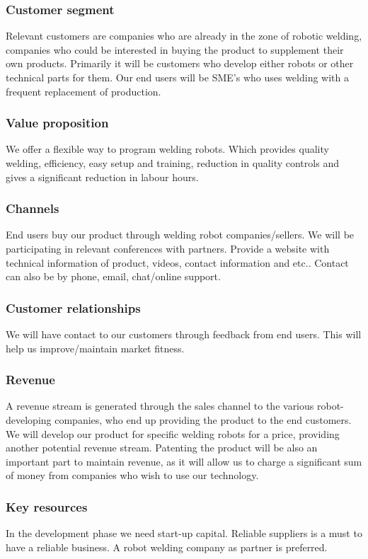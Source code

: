 \subsubsection{Customer segment}
Relevant customers are companies who are already in the zone of robotic welding, companies who could be interested in buying the product to supplement their own products. Primarily it will be customers who develop either robots or other technical parts for them.  
Our end users will be SME's who uses welding with a frequent replacement of production.
\subsubsection{Value proposition}
We offer a flexible way to program welding robots. Which provides quality welding, efficiency, easy setup and training, reduction in quality controls and gives a significant reduction in labour hours.
\subsubsection{Channels}
End users buy our product through welding robot companies/sellers. We will be participating in relevant conferences with partners. Provide a website with technical information of product, videos, contact information and etc.. Contact can also be by phone, email, chat/online support.	
\subsubsection{Customer relationships}
We will have contact to our customers through feedback from end users. This will help us improve/maintain market fitness.
\subsubsection{Revenue}
A revenue stream is generated through the sales channel to the various robot-developing companies, who end up providing the product to the end customers.
We will develop our product for specific welding robots for a price, providing another potential revenue stream. 
Patenting the product will be also an important part to maintain revenue, as it will allow us to charge a significant sum of money from companies who wish to use our technology.
\subsubsection{Key resources}
In the development phase we need start-up capital. Reliable suppliers is a must to have a reliable business. A robot welding company as partner is preferred. 
